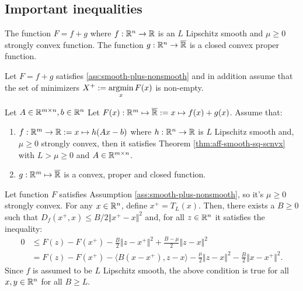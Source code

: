 \documentclass[12pt]{article}
\begin{document}
    \subsection{Important inequalities}
            \begin{assumption}\label{ass:smooth-plus-nonsmooth}
                The function $F = f + g$ where $f:\mathbb R^n \rightarrow \mathbb R$ is an $L$ Lipschitz smooth and $\mu \ge 0$ strongly convex function. 
                The function $g:\mathbb R^n \rightarrow \overline {\mathbb R}$ is a closed convex proper function. 
            \end{assumption}
            \begin{assumption}\label{ass:smooth-plus-nonsmooth-x}
                Let $F = f + g$ satisfies \ref{ass:smooth-plus-nonsmooth} and in addition assume that the set of minimizers $X^+ := \mathop{\rm argmin}\limits_{x}F(x)$ is non-empty. 
            \end{assumption}
            \begin{assumption}\label{ass:snorm-smth-p-nsmth}
                Let $A \in \mathbb R^{m\times n}, b \in \mathbb R^n$
                Let $F(x): \mathbb R^{m} \mapsto \overline{\mathbb R} := x \mapsto f(x) + g(x)$. 
                Assume that: 
                \begin{enumerate}[noitemsep]
                    \item $f:\mathbb R^m \rightarrow \mathbb R := x \mapsto h(Ax - b)$ where $h:\mathbb R^n\rightarrow \mathbb R$ is $L$ Lipschitz smooth and, $\mu\ge 0$ strongly convex, then it satisfies Theorem \ref{thm:aff-smooth-sq-scnvx} with $L > \mu \ge 0$ and $A \in \mathbb R^{m \times n}$. 
                    \item $g:\mathbb R^m \mapsto \overline {\mathbb R}$ is a convex, proper and closed function. 
                \end{enumerate}
            \end{assumption}
            \begin{theorem}\label{thm:pg-ineq}
                Let function $F$ satisfies Assumption \ref{ass:smooth-plus-nonsmooth}, so it's $\mu \ge 0$ strongly convex. 
                For any $x\in \mathbb R^n$, define $x^+ = T_L(x)$. 
                Then, there exists a $B \ge 0$ such that $D_f(x^+, x) \le B/2 \Vert x^+ - x\Vert^2$ and, for all $z \in \mathbb R^n$ it satisfies the inequality: 
                \begin{align*}
                    0&\le F(z) - F(x^+) - \frac{B}{2}\Vert z - x^+\Vert^2  + \frac{B - \mu}{2}\Vert z - x\Vert^2
                    \\
                    &=  F(z) - F(x^+) - \langle B(x - x^+), z - x\rangle
                    - \frac{\mu}{2}\Vert z - x\Vert^2
                    - \frac{B}{2}\Vert x - x^+\Vert^2. 
                \end{align*}
                Since $f$ is assumed to be $L$ Lipschitz smooth, the above condition is true for all $x, y \in \mathbb R^n$ for all $B \ge L$. 
            \end{theorem}
\end{document}

